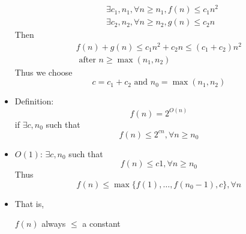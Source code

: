 \begin{frame}[allowframebreaks]
\begin{itemize}
\begin{equation*}
    \begin{split}
      & \exists c_1, n_1, \forall n \geq n_1, f(n) \leq c_1 n^2 \\
      & \exists c_2, n_2, \forall n \geq n_2, g(n) \leq c_2 n
    \end{split}
  \end{equation*}
Then
\begin{gather*}
  f(n) + g(n) \leq c_1 n^2 + c_2 n \leq (c_1+c_2) n^2\\
  \text{ after } n \geq \max (n_1, n_2)
\end{gather*}
Thus we choose
\begin{equation*}
  c = c_1 + c_2 \text{ and } n_0 = \max(n_1, n_2)
\end{equation*}
\item Definition:
  \begin{equation*}
f(n) =  2^{O(n)}
\end{equation*}
if
$\exists c, n_0$ such that
\begin{equation*}
f(n) \leq 2^{cn}, \forall n \geq n_0
\end{equation*}
\item $O(1)$: $\exists c, n_0$ such that 
  \begin{equation*}
f(n)   \leq c 1, \forall n \geq n_0
\end{equation*}
Thus
\begin{equation*}
  f(n) \leq
  \max \{f(1), \ldots, f(n_0-1), c\}, \forall n
\end{equation*}
\item That is,
  \begin{center}
  $f(n)$ always $\leq$ a constant
\end{center}
\end{itemize}\end{frame}



